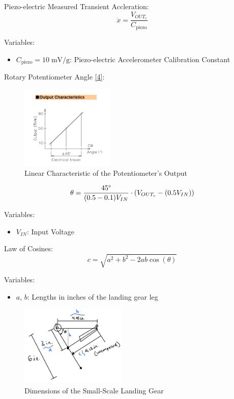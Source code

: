 \documentclass{article}
\begin{document}
Piezo-electric Measured Transient Accleration:
\begin{equation}
    \ddot{x} = \dfrac{V_{OUT_c}}{C_{\text{piezo}}}
\end{equation}

Variables:
\begin{itemize}
    \item \(C_{\text{piezo}} = 10\; \text{mV/g}\): Piezo-electric Accelerometer Calibration Constant
\end{itemize}
\vspace{5mm}

Rotary Potentiometer Angle  \hyperlink{4}{[4]}:
\begin{figure}[H]
    \centering
    \includegraphics[width=0.4\textwidth]{lab8images/rotarypotentiometeroutput.png}
    \caption{Linear Characteristic of the Potentiometer's Output}
    \label{fig:outputpotentiometer}
\end{figure}
\begin{equation}
    \theta = \dfrac{45\degree}{(0.5-0.1)V_{IN}}\cdot(V_{OUT_{c}} - (0.5V_{IN}))
\end{equation}

Variables:
\begin{itemize}
    \item \(V_{IN}\): Input Voltage
\end{itemize}
\vspace{5mm}

Law of Cosines:
\begin{equation}
    c = \sqrt{a^{2} + b^{2} - 2ab\cos{(\theta)}}
\end{equation}

Variables:
\begin{itemize}
    \item \(a,\, b\): Lengths in inches of the landing gear leg
\end{itemize}

\begin{figure}[H]
    \centering
    \includegraphics[width = 0.45\textwidth]{lab8images/landinggeardimensions.png}
    \caption{Dimensions of the Small-Scale Landing Gear}
    \label{fig:geardimensions}
\end{figure}
\vspace{5mm}
\end{document}
